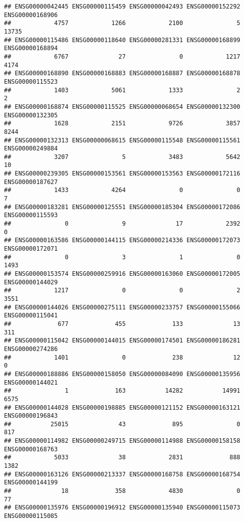 \documentclass[
]{article}
\begin{document}
\begin{verbatim}
## ENSG00000042445 ENSG00000115459 ENSG00000042493 ENSG00000152292 ENSG00000168906 
##            4757            1266            2100               5           13735 
## ENSG00000115486 ENSG00000118640 ENSG00000281331 ENSG00000168899 ENSG00000168894 
##            6767              27               0            1217            4174 
## ENSG00000168890 ENSG00000168883 ENSG00000168887 ENSG00000168878 ENSG00000115523 
##            1403            5061            1333               2               2 
## ENSG00000168874 ENSG00000115525 ENSG00000068654 ENSG00000132300 ENSG00000132305 
##            1628            2151            9726            3857            8244 
## ENSG00000132313 ENSG00000068615 ENSG00000115548 ENSG00000115561 ENSG00000249884 
##            3207               5            3483            5642              10 
## ENSG00000239305 ENSG00000153561 ENSG00000153563 ENSG00000172116 ENSG00000187627 
##            1433            4264               0               0               7 
## ENSG00000183281 ENSG00000125551 ENSG00000185304 ENSG00000172086 ENSG00000115593 
##               0               9              17            2392               0 
## ENSG00000163586 ENSG00000144115 ENSG00000214336 ENSG00000172073 ENSG00000172071 
##               0               3               1               0            1493 
## ENSG00000153574 ENSG00000259916 ENSG00000163060 ENSG00000172005 ENSG00000144029 
##            1217               0               0               2            3551 
## ENSG00000144026 ENSG00000275111 ENSG00000233757 ENSG00000155066 ENSG00000115041 
##             677             455             133              13             311 
## ENSG00000115042 ENSG00000144015 ENSG00000174501 ENSG00000186281 ENSG00000274286 
##            1401               0             238              12               0 
## ENSG00000188886 ENSG00000158050 ENSG00000084090 ENSG00000135956 ENSG00000144021 
##               1             163           14282           14991            6575 
## ENSG00000144028 ENSG00000198885 ENSG00000121152 ENSG00000163121 ENSG00000196843 
##           25015              43             895               0             817 
## ENSG00000114982 ENSG00000249715 ENSG00000114988 ENSG00000158158 ENSG00000168763 
##            5033              38            2831             888            1382 
## ENSG00000163126 ENSG00000213337 ENSG00000168758 ENSG00000168754 ENSG00000144199 
##              18             358            4830               0              77 
## ENSG00000135976 ENSG00000196912 ENSG00000135940 ENSG00000115073 ENSG00000115085 

\end{verbatim}
\end{document}

